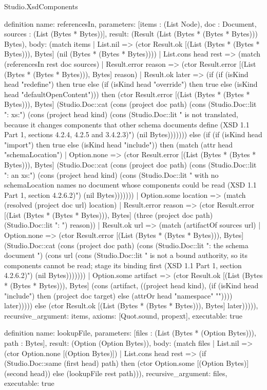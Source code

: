 \begin{lexlean}{Studio.XsdComponents}
\begin{semanticmodule}
definition{
  name: referencesIn,
  parameters: [items : (List Node), doc : Document, sources : (List (Bytes * Bytes))],
  result: (Result (List (Bytes * (Bytes * Bytes))) Bytes),
  body: (match items
    | List.nil => (ctor Result.ok [(List (Bytes * (Bytes * Bytes))), Bytes] (nil (Bytes * (Bytes * Bytes))))
    | List.cons head rest => (match (referencesIn rest doc sources)
      | Result.error reason => (ctor Result.error [(List (Bytes * (Bytes * Bytes))), Bytes] reason)
      | Result.ok later => (if (if (isKind head "redefine") then true else (if (isKind head "override") then true else (isKind head "defaultOpenContent"))) then (ctor Result.error [(List (Bytes * (Bytes * Bytes))), Bytes] (Studio.Doc::cat (cons (project doc path) (cons (Studio.Doc::lit ": xs:") (cons (project head kind) (cons (Studio.Doc::lit " is not translated, because it changes components that other schema documents define (XSD 1.1 Part 1, sections 4.2.4, 4.2.5 and 3.4.2.3)") (nil Bytes))))))) else (if (if (isKind head "import") then true else (isKind head "include")) then (match (attr head "schemaLocation")
        | Option.none => (ctor Result.error [(List (Bytes * (Bytes * Bytes))), Bytes] (Studio.Doc::cat (cons (project doc path) (cons (Studio.Doc::lit ": an xs:") (cons (project head kind) (cons (Studio.Doc::lit " with no schemaLocation names no document whose components could be read (XSD 1.1 Part 1, section 4.2.6.2)") (nil Bytes)))))))
        | Option.some location => (match (resolved (project doc url) location)
          | Result.error reason => (ctor Result.error [(List (Bytes * (Bytes * Bytes))), Bytes] (three (project doc path) (Studio.Doc::lit ": ") reason))
          | Result.ok url => (match (artifactOf sources url)
            | Option.none => (ctor Result.error [(List (Bytes * (Bytes * Bytes))), Bytes] (Studio.Doc::cat (cons (project doc path) (cons (Studio.Doc::lit ": the schema document ") (cons url (cons (Studio.Doc::lit " is not a bound authority, so its components cannot be read; stage its binding first (XSD 1.1 Part 1, section 4.2.6.2)") (nil Bytes)))))))
            | Option.some artifact => (ctor Result.ok [(List (Bytes * (Bytes * Bytes))), Bytes] (cons (artifact, ((project head kind), (if (isKind head "include") then (project doc target) else (attrOr head "namespace" "")))) later))))) else (ctor Result.ok [(List (Bytes * (Bytes * Bytes))), Bytes] later))))),
  recursive_argument: items,
  axioms: [Quot.sound, propext],
  executable: true
}

definition{
  name: lookupFile,
  parameters: [files : (List (Bytes * (Option Bytes))), path : Bytes],
  result: (Option (Option Bytes)),
  body: (match files
    | List.nil => (ctor Option.none [(Option Bytes)])
    | List.cons head rest => (if (Studio.Doc::same (first head) path) then (ctor Option.some [(Option Bytes)] (second head)) else (lookupFile rest path))),
  recursive_argument: files,
  executable: true
}


\end{semanticmodule}
\end{lexlean}

